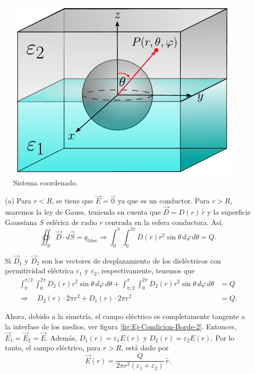 \begin{ejemplo}
\begin{figure}[H]
    \centering
    \includegraphics[scale = 0.6]{Figuras/Ej-Condicion-Borde.pdf}
    \caption{Sistema coordenado.}
    \label{fig:Ej-Condicion-Borde-1}
\end{figure}

\begin{itemize}
    \item[(a)] Para $r < R$, se tiene que $\Vec{E} = \Vec{0}$ ya que es un conductor. Para $r > R$, usaremos la ley de Gauss, teniendo en cuenta que $\Vec{D} = D(r) \,\hat{r}$ y la superficie Gaussiana $S$ esférica de radio $r$ centrada en la esfera conductora. Así,
    $$\oiint_S \Vec{D} \cdot d\Vec{S} =  q_{libre} \Rightarrow \int_0^{\pi} \int_0^{2\pi} D(r) r^2 \sin \theta \,d\varphi \,d\theta = Q.$$

    Si $\Vec{D}_1$ y $\Vec{D}_2$ son los vectores de desplazamiento de los dieléctricos con permitividad eléctrica  $\varepsilon_1$ y $\varepsilon_2$, respectivamente, tenemos que
    \begin{align*}
     \int_0^{\pi/2} \int_0^{2\pi} D_2(r) r^2 \sin \theta \,d\varphi \,d\theta + \int_{\pi/2}^{\pi} \int_0^{2\pi} D_2(r) r^2 \sin \theta \,d\varphi \,d\theta &= Q\\
    \Rightarrow \quad D_2(r) \cdot 2\pi r^2 + D_1(r) \cdot 2\pi r^2 &= Q.   
    \end{align*}

    Ahora, debido a la simetría, el campo eléctrico es completamente tangente a la interfase de los medios, ver figura \ref{fig:Ej-Condicion-Borde-2}. Entonces, $\Vec{E}_1 = \Vec{E}_2 = \Vec{E}$. Además, $D_1(r) = \varepsilon_1 E(r)$ y $D_2(r) = \varepsilon_2 E(r)$. Por lo tanto, el campo eléctrico, para $r > R$, está dado por
    $$\Vec{E}(r) = \frac{Q}{2\pi r^2(\varepsilon_1 + \varepsilon_2)} \,\hat{r}.$$


\end{itemize}
\end{ejemplo}
